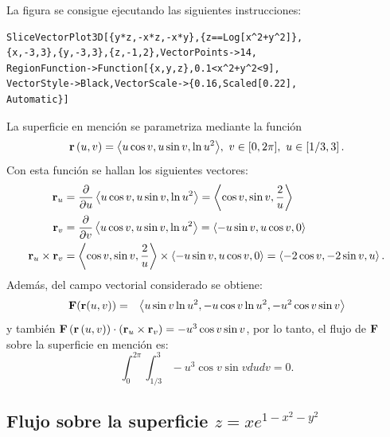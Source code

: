 La figura se consigue ejecutando las siguientes instrucciones:

\begin{tcolorbox}[title=\bf Instrucción \verb"Mathematica"]\begin{Verbatim}[formatcom=\letraverbatim]
SliceVectorPlot3D[{y*z,-x*z,-x*y},{z==Log[x^2+y^2]},
{x,-3,3},{y,-3,3},{z,-1,2},VectorPoints->14,
RegionFunction->Function[{x,y,z},0.1<x^2+y^2<9],
VectorStyle->Black,VectorScale->{0.16,Scaled[0.22],
Automatic}]
\end{Verbatim}
\end{tcolorbox}

La superficie en mención se parametriza mediante la función
\[{\bf r}\left( u,v\right) =\left\langle u\cos v,u\sin v,\ln u^{2}\right\rangle\!,\,\, v\in [0,2\pi], \,\, u\in \left[1/3,3\right ].\] Con esta función se hallan los siguientes vectores:
{\small
\begin{align*}
{\bf r}_{u} &= \frac{\partial}{\partial u}\left \langle u\cos v, u\sin v, \ln u^2 \right \rangle = \left \langle \cos v, \sin v, \frac{2}{u} \right \rangle \\
{\bf r}_{v} &= \frac{\partial}{\partial v}\left \langle u\cos v, u\sin v, \ln u^2 \right \rangle = \left \langle -u\sin v, u\cos v, 0 \right \rangle \\
{\bf r}_{u} \times {\bf r}_{v} &= \left \langle \cos v, \sin v, \frac{2}{u} \right \rangle \times \left \langle -u\sin v, u\cos v, 0 \right \rangle = \left \langle -2\cos v, -2\sin v, u \right \rangle.
\end{align*}
}
Además, del campo vectorial considerado se obtiene:
\begin{eqnarray*}
{\bf F}({\bf r}(u,v)) %
&=& \left\langle u\sin v\ln u^{2},-u\cos v\ln u^{2},-u^{2}\cos v\sin v \right\rangle
\end{eqnarray*}
y también ${\bf F}\left({\bf r}\left( u,v\right) \right) \cdot \left({\bf r}_{u}\times {\bf r}_{v}\right) = -u^{3}\cos v\sin v$,
por lo tanto, el flujo de ${\bf F}$ sobre la superficie en mención es:
\[\int_{0}^{2\pi }\int_{1/3}^{3}-u^{3}\cos v\sin vdudv= 0.\]

\subsection{Flujo sobre la superficie \texorpdfstring{$z=xe^{1-x^2-y^2}$}{z=xe a la potencia de 1-x2-y2}}

